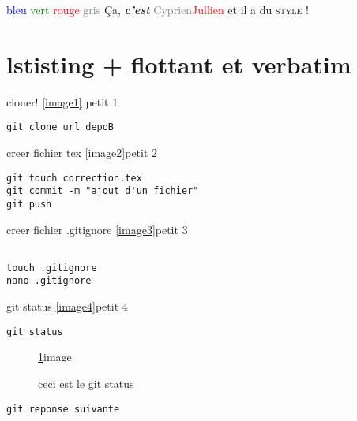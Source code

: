 \documentclass[french,titlepage] {article}
\newcommand{\mystyle}[2][]{{#1#2}}
\newcommand{\name}[2]{\textcolor{gray}{#1}\textcolor{red}{#2}}
\begin{document}
\textcolor{blue}{bleu} \textcolor{green}{vert} \textcolor{red}{rouge} \textcolor{gray}{gris}
Ça, \mystyle[\bfseries\slshape]{c’est} \name{Cyprien}{Jullien} et il a du \mystyle[\scshape\large]{style} !


\section[test]{lstisting + flottant et verbatim}


\begin{enumerate}

\item cloner! \ref{image1} petit 1\begin{lstlisting}
git clone url depoB
\end{lstlisting} 
\label{image1}

\item creer fichier tex
\ref{image2}petit 2

\item \begin{lstlisting}
git touch correction.tex
git commit -m "ajout d'un fichier"
git push
\end{lstlisting} 
\label{image2}

\item creer fichier .gitignore
\ref{image3}petit 3
\begin{lstlisting}

touch .gitignore
nano .gitignore

\end{lstlisting} 
 \label{image3}

\item \item git status \ref{image4}petit 4
\begin{lstlisting}
git status
\end{lstlisting} 
\label{image4}
\begin{figure}[h]

\item 

\ref{image}image
\caption{ceci est le git status \label{image}}
\end{figure}
\begin{lstlisting}
git reponse suivante


\end{lstlisting}
\end{enumerate}
\end{document}
